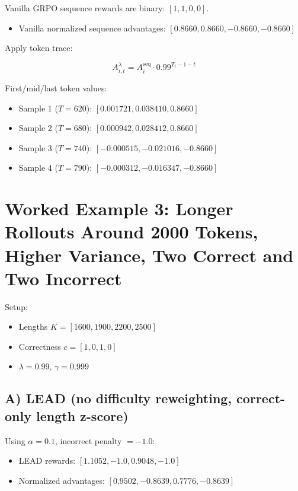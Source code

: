 \documentclass[11pt]{article}
\begin{document}
Vanilla GRPO sequence rewards are binary: $[1,1,0,0]$.

\begin{itemize}
\item Vanilla normalized sequence advantages: $[0.8660,0.8660,-0.8660,-0.8660]$
\end{itemize}

Apply token trace:

\begin{equation}
A_{i,t}^{\lambda}=A_i^{\mathrm{seq}}\cdot 0.99^{T_i-1-t}
\end{equation}

First/mid/last token values:

\begin{itemize}
\item Sample 1 ($T=620$): $[0.001721,0.038410,0.8660]$
\item Sample 2 ($T=680$): $[0.000942,0.028412,0.8660]$
\item Sample 3 ($T=740$): $[-0.000515,-0.021016,-0.8660]$
\item Sample 4 ($T=790$): $[-0.000312,-0.016347,-0.8660]$
\end{itemize}

\section{Worked Example 3: Longer Rollouts Around 2000 Tokens, Higher Variance, Two Correct and Two Incorrect}

Setup:

\begin{itemize}
\item Lengths $K=[1600,1900,2200,2500]$
\item Correctness $c=[1,0,1,0]$
\item $\lambda=0.99$, $\gamma=0.999$
\end{itemize}

\subsection*{A) LEAD (no difficulty reweighting, correct-only length z-score)}

Using $\alpha=0.1$, incorrect penalty $=-1.0$:

\begin{itemize}
\item LEAD rewards: $[1.1052,-1.0,0.9048,-1.0]$
\item Normalized advantages: $[0.9502,-0.8639,0.7776,-0.8639]$
\end{itemize}
\end{document}
